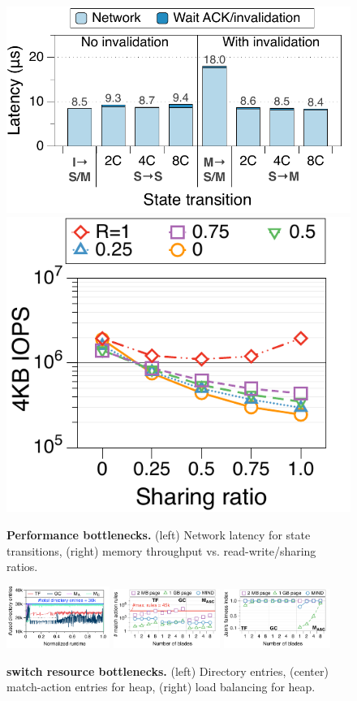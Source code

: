 \begin{figure}[t!]
  \centering
  \includegraphics[width=0.58\linewidth]{fig/mind/15_transition_latency}\hfill
  \includegraphics[width=0.40\linewidth]{fig/mind/16_sharing_ratio}
  \vspace{-0.9em}
  \caption{\textbf{Performance bottlenecks.} (left) Network latency for state transitions, (right) memory throughput vs. read-write/sharing ratios.}
  \label{fig:micro_latency}
  \label{fig:micro_band} 
  \label{fig:perfbottlenecks}
\end{figure}

\begin{figure}[ht!]
  \centering
  \includegraphics[width=0.3\textwidth]{fig/mind/09_switch_entries_over_time}\hspace{1em}
  \includegraphics[width=0.31\textwidth]{fig/mind/12_micro_num_entry}\hspace{1em}
  \includegraphics[width=0.31\textwidth]{fig/mind/12_micro_load_balance}
  \vspace{-0.9em}
  \caption{\textbf{\mind switch resource bottlenecks.} (left) Directory entries, (center) match-action entries for heap, (right) load balancing for heap.}
  \label{fig:resbottlenecks}
  \label{fig:micro_load_balance}
  \label{fig:micro_num_entry}
  \label{fig:macro_cache_dir}
\end{figure}

